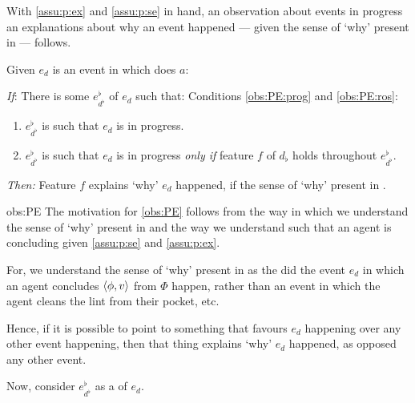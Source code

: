 \begin{note}
  With \autoref{assu:p:ex} and \autoref{assu:p:se} in hand, an observation about events in progress an explanations about why an event happened --- given the sense of `why' present in \qWhy{} --- follows.

  \begin{observation}%
    \label{obs:PE}%
    Given \(e_{d}\) is an event in which \vAgent{} does \(a\):

    \begin{itenum}
    \item[\emph{If}:]
      There is some \se{} \(e^{\flat}_{d^{\flat}}\) of \(e_{d}\) such that:
      Conditions \ref{obs:PE:prog} and \ref{obs:PE:ros}:
      \begin{enumerate}[label=\arabic*., ref=\arabic*]
      \item
        \label{obs:PE:prog}
        \(e^{\flat}_{d^{\flat}}\) is such that \(e_{d}\) is in progress.
      \item
        \label{obs:PE:ros}
        \(e^{\flat}_{d^{\flat}}\) is such that \(e_{d}\) is in progress \emph{only if} feature \(f\) of \(d_{\flat}\) holds throughout \(e^{\flat}_{d^{\flat}}\).
      \end{enumerate}
    \item[\emph{Then:}]
      Feature \(f\) explains `why' \(e_{d}\) happened, if the sense of `why' present in \qWhy{}.
    \end{itenum}
    \vspace{-\baselineskip}
  \end{observation}

  \begin{motivation}{obs:PE}
    The motivation for \autoref{obs:PE} follows from the way in which we understand the sense of `why' present in \qWhy{} and the way we understand \se{} such that an agent is concluding given \autoref{assu:p:se} and \autoref{assu:p:ex}.

    For, we understand the sense of `why' present in \qWhy{} as the did the event \(e_{d}\) in which an agent concludes \(\langle \phi, v \rangle\) from \(\Phi\) happen, rather than an event in which the agent cleans the lint from their pocket, etc.

    Hence, if it is possible to point to something that favours \(e_{d}\) happening over any other event happening, then that thing explains `why' \(e_{d}\) happened, as opposed any other event.

    Now, consider \(e^{\flat}_{d^{\flat}}\) as a \se{} of \(e_{d}\).


\end{motivation}
\end{note}
